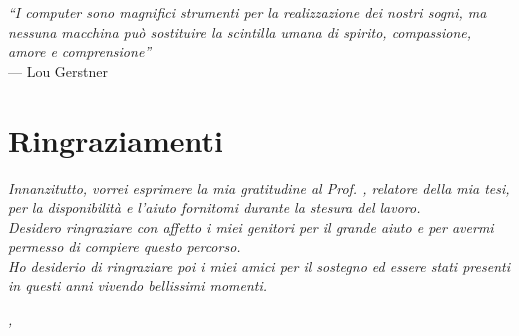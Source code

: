 \cleardoublepage
{}
{}


\begin{flushright}{
    \slshape
    ``I computer sono magnifici strumenti per la realizzazione dei nostri sogni, ma nessuna macchina può sostituire la scintilla umana di spirito, compassione, amore e comprensione''} \\
    \medskip
    --- Lou Gerstner
\end{flushright}


\bigskip

\begingroup
\let\clearpage\relax
\let\cleardoublepage\relax
\let\cleardoublepage\relax

\chapter*{Ringraziamenti}

\noindent \textit{Innanzitutto, vorrei esprimere la mia gratitudine al Prof. \myProf, relatore della mia tesi, per la disponibilità e l'aiuto fornitomi durante la stesura del lavoro.}\\

\noindent \textit{Desidero ringraziare con affetto i miei genitori per il grande aiuto e per avermi permesso di compiere questo percorso.}\\

\noindent \textit{Ho desiderio di ringraziare poi i miei amici per il sostegno ed essere stati presenti in questi anni vivendo bellissimi momenti.}\\
\bigskip

\noindent\textit{\myLocation, \myTime}
\hfill \myName

\endgroup
